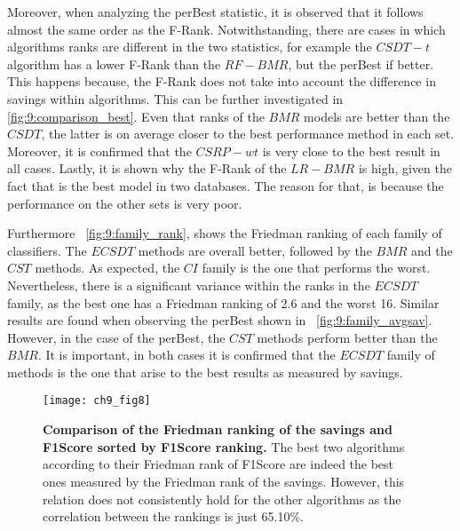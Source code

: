 {  Moreover, when analyzing the perBest statistic, it is observed that it follows almost the same 
  order as the F-Rank. Notwithstanding, there are cases in which algorithms ranks are different in 
  the two statistics, for example the $CSDT-t$ algorithm has a lower F-Rank than the $RF-BMR$, 
  but the perBest if better. This happens because, the F-Rank does not take into account the 
  difference in savings within algorithms. This can be further investigated in \figurename{ 
  \ref{fig:9:comparison_best}}. Even that ranks of the $BMR$ models are better than the $CSDT$, the 
  latter is on average closer to the best performance method in each set. Moreover, it is confirmed 
  that the $CSRP-wt$ is very close to the best result in all cases. Lastly, it is shown why the 
  F-Rank of the $LR-BMR$ is high, given the fact that is the best model in two databases. The 
  reason  for that, is because the performance on the other sets is very poor.

  Furthermore \figurename{~\ref{fig:9:family_rank}}, shows the Friedman ranking of each family of 
  classifiers. The $ECSDT$ methods are overall better, followed by the $BMR$ and the $CST$ methods. 
  As expected, the $CI$ family is the one that performs the worst. Nevertheless, there is 
  a significant variance within the ranks in the $ECSDT$ family, as the best one has a Friedman 
  ranking of 2.6 and the worst 16. Similar results are found when observing the perBest shown in 
  \figurename{~\ref{fig:9:family_avgsav}}. However, in the case of the perBest, the $CST$ methods 
  perform better than the $BMR$. It is important, in both cases it is confirmed that the $ECSDT$ 
  family of methods is the one that arise to the best results as measured by savings.
  
  \begin{figure}[t!]
  \centering
  \texttt{[image: ch9\_fig8]}
  \caption{\textbf{Comparison of the Friedman ranking of the savings and F1Score sorted by F1Score 
  ranking.} The best two algorithms according to their Friedman rank of F1Score are indeed the 
  best ones measured by the Friedman rank of the savings. However, this relation does not 
  consistently hold for the other algorithms as the correlation between the rankings is just 
  65.10\%.}
  \label{fig:9:friedman_vs_fscore}
  \end{figure}
  
}
